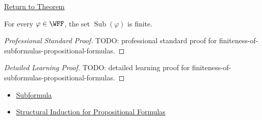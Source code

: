 \newpage
{}
\label{prf:finiteness-of-subformulas-propositional-formulas}

\begin{remark*}[Return]
\hyperref[lem:finiteness-of-subformulas-propositional-formulas]{Return to Theorem}
\end{remark*}

\begin{theorem*}
For every \(\varphi\in\WFF\), the set \(\operatorname{Sub}(\varphi)\) is finite.
\end{theorem*}

\begin{proof}[Professional Standard Proof]
\LRAProofBodyStart
TODO: professional standard proof for finiteness-of-subformulas-propositional-formulas.
\end{proof}

\begin{proof}[Detailed Learning Proof]
\LRAProofBodyStart
TODO: detailed learning proof for finiteness-of-subformulas-propositional-formulas.
\end{proof}

\begin{remark*}
\end{remark*}

\begin{dependencies}
\begin{itemize}
  \item \hyperref[def:subformula-propositional-logic]{Subformula}
  \item \hyperref[thm:structural-induction-propositional-formulas]{Structural Induction for Propositional Formulas}
\end{itemize}
\end{dependencies}

\clearpage
